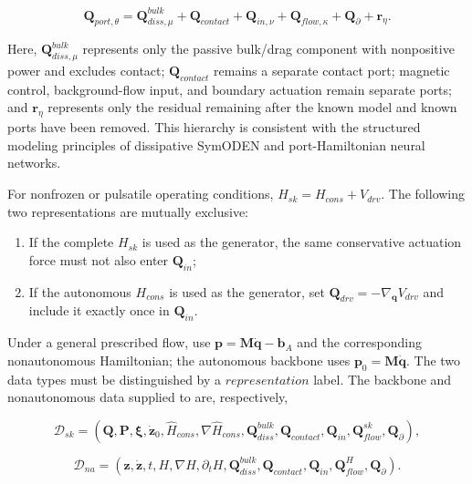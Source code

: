 \begin{equation}
\label{eq:hamiltonian-3-73}
\mathbf{Q}_{port,\theta} = \mathbf{Q}_{diss,\mu}^{bulk} + \mathbf{Q}_{contact} + \mathbf{Q}_{in,\nu} + \mathbf{Q}_{flow,\kappa} + \mathbf{Q}_{\partial} + \mathbf{r}_{\eta}.
\end{equation}

Here, \(\mathbf{Q}_{diss,\mu}^{bulk}\) represents only the passive bulk/drag component with nonpositive power and excludes contact; \(\mathbf{Q}_{contact}\) remains a separate contact port; magnetic control, background-flow input, and boundary actuation remain separate ports; and \(\mathbf{r}_{\eta}\) represents only the residual remaining after the known model and known ports have been removed. This hierarchy is consistent with the structured modeling principles of dissipative SymODEN and port-Hamiltonian neural networks.\cite{Zhong2020Dissipative,Desai2021PHNN}

For nonfrozen or pulsatile operating conditions, \(H_{sk}=H_{cons}+V_{drv}\). The following two representations are mutually exclusive:

\begin{enumerate}
\def\labelenumi{\arabic{enumi}.}
\tightlist
\item
  If the complete \(H_{sk}\) is used as the generator, the same conservative actuation force must not also enter \(\mathbf{Q}_{in}\);
\item
  If the autonomous \(H_{cons}\) is used as the generator, set \(\mathbf{Q}_{drv}=-\nabla_{\mathbf{q}}V_{drv}\) and include it exactly once in \(\mathbf{Q}_{in}\).
\end{enumerate}

Under a general prescribed flow, use \(\mathbf{p}=\mathbf{M}\dot{\mathbf{q}}-\mathbf{b}_{A}\) and the corresponding nonautonomous Hamiltonian; the autonomous backbone uses \(\mathbf{p}_{0}=\mathbf{M}\dot{\mathbf{q}}\). The two data types must be distinguished by a \(representation\) label. The backbone and nonautonomous data supplied to  are, respectively,

\begin{equation}
\label{eq:hamiltonian-3-74}
\mathcal{D}_{sk} = \left( \mathbf{Q},\mathbf{P},\bm{\xi},{\dot{\mathbf{z}}}_{0},{\widehat{H}}_{cons},\nabla{\widehat{H}}_{cons},\mathbf{Q}_{diss}^{bulk},\mathbf{Q}_{contact},\mathbf{Q}_{in},\mathbf{Q}_{flow}^{sk},\mathbf{Q}_{\partial} \right),
\end{equation}

\begin{equation}
\label{eq:hamiltonian-3-75}
\mathcal{D}_{na} = \left( \mathbf{z},\dot{\mathbf{z}},t,H,\nabla H,\partial_{t}H,\mathbf{Q}_{diss}^{bulk},\mathbf{Q}_{contact},\mathbf{Q}_{in},\mathbf{Q}_{flow}^{H},\mathbf{Q}_{\partial} \right).
\end{equation}


